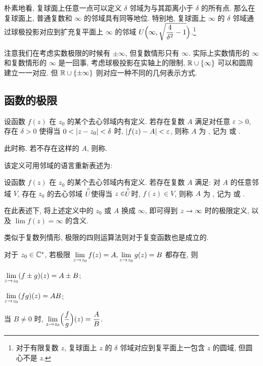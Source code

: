 朴素地看, 复球面上任意一点可以定义 $\delta$ 邻域为与其距离小于 $\delta$ 的所有点.
那么在复球面上, 普通复数和 $\infty$ 的邻域具有同等地位.
特别地, 复球面上 $\infty$ 的 $\delta$ 邻域通过球极投影对应到扩充复平面上 $\infty$ 的邻域
$U\Bigl(\infty, \sqrt{\dfrac4{\delta^2}-1}\Bigr)$.\footnote{
  对于有限复数 $z$, 复球面上 $z$ 的 $\delta$ 邻域对应到复平面上一包含 $z$ 的圆域, 但圆心不是 $z$.
}

注意我们在考虑实数极限的时候有 $\pm\infty$, 但复数情形只有 $\infty$.
实际上实数情形的 $\infty$ 和复数情形的 $\infty$ 是一回事, 考虑球极投影在实轴上的限制, ${\mathbb{R}}\cup\{\infty\}$ 可以和圆周建立一一对应.
但 ${\mathbb{R}}\cup\{\pm\infty\}$ 则对应一种不同的几何表示方式.


\subsection{函数的极限}

\begin{definition}
  设函数 $f(z)$ 在 $z_0$ 的某个去心邻域内有定义.
  若存在复数 $A$ 满足对任意 $\varepsilon>0$, 存在 $\delta>0$ 使得当 $0<\lvert z-z_0\rvert<\delta$ 时, $\lvert f(z)-A\rvert<\varepsilon$, 则称 $A$ 为 , 记为  或 .
\end{definition}

此时称.
若不存在这样的 $A$, 则称.

该定义可用邻域的语言重新表述为:
\begin{definition}
  设函数 $f(z)$ 在 $z_0$ 的某个去心邻域内有定义.
  若存在复数 $A$ 满足: 对 $A$ 的任意邻域 $V$, 存在 $z_0$ 的去心邻域 $\stackrel{\circ}{U}\!\!$ 使得当 $z\in\stackrel{\circ}{U}\!\!$ 时, $f(z)\in V$, 则称 $A$ 为 , 记为  或 .
\end{definition}

在此表述下, 将上述定义中的 $z_0$ 或 $A$ 换成 $\infty$, 即可得到 $z\rightarrow\infty$ 时的极限定义, 以及 $\lim f(z)=\infty$ 的含义.

类似于复数列情形, 极限的四则运算法则对于复变函数也是成立的.
\begin{theorem}
  \label{thm:limfunctionfour}
  对于 $z_0\in{\mathbb{C}}^*$, 若极限 $\lim\limits_{z\rightarrow z_0}f(z)=A,\lim\limits_{z\rightarrow z_0}g(z)=B$ 都存在, 则
  \begin{enuma}
    \item $\lim\limits_{z\rightarrow z_0}(f\pm g)(z)=A\pm B$;
    \item $\lim\limits_{z\rightarrow z_0}(fg)(z)=AB$;
    \item 当 $B\neq 0$ 时, $\lim\limits_{z\rightarrow z_0}\Bigl(\dfrac fg\Bigr)(z)=\dfrac AB$.
  \end{enuma}
\end{theorem}

